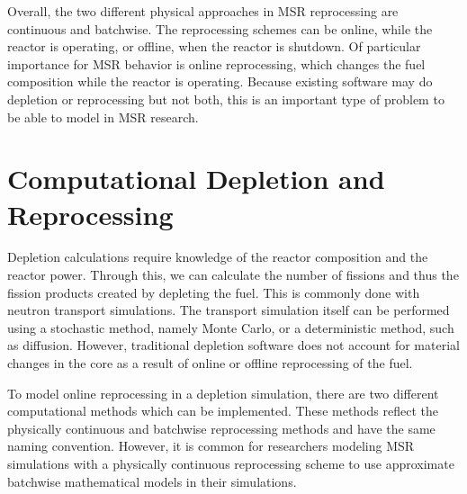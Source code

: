 Overall, the two different physical approaches in MSR reprocessing are continuous and batchwise. The reprocessing schemes can be online, while the reactor is operating, or offline, when the reactor is shutdown. Of particular importance for MSR behavior is online reprocessing, which changes the fuel composition while the reactor is operating.
Because existing software may do depletion or reprocessing but not both, this is an important type of problem to be able to model in MSR research.

\section{Computational Depletion and Reprocessing}

Depletion calculations require knowledge of the reactor composition and the reactor power. Through this, we can calculate the number of fissions and thus the fission products created by depleting the fuel. This is commonly done with neutron transport simulations.
The transport simulation itself can be performed using a stochastic method, namely Monte Carlo, or a deterministic method, such as diffusion. 
However, traditional depletion software does not account for material changes in the core as a result of online or offline reprocessing of the fuel.



To model online reprocessing in a depletion simulation, there are two different computational methods which can be implemented. These methods reflect the physically continuous and batchwise reprocessing methods and have the same naming convention.
However, it is common for researchers modeling MSR simulations with a physically continuous reprocessing scheme to use approximate batchwise mathematical models in their simulations.


